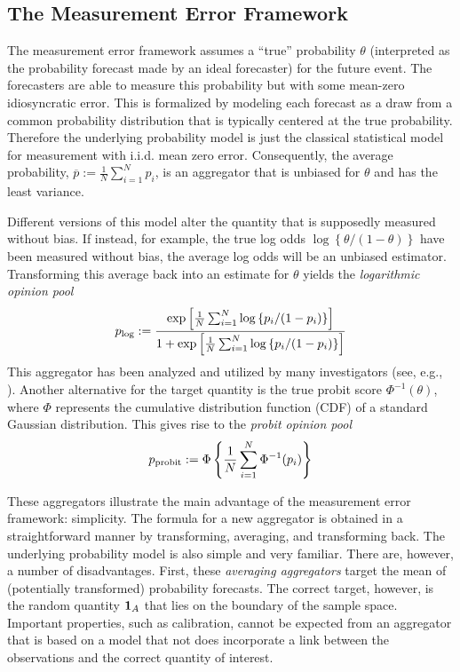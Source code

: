 \documentclass[11pt]{article}
\theoremstyle{definition}
\theoremstyle{definition}
\def\pb{\overline{p}}
\def\one{{\bf 1}}
\def\probit{p_{\rm probit}}
\def\plog{p_{\rm log}}
\begin{document}
\subsection{The Measurement Error Framework}
\label{ss:measurement}
The measurement error framework assumes a ``true'' probability
$\theta$ (interpreted as the probability forecast made by an ideal
forecaster) for the future event.  The forecasters are able to measure
this probability but with some mean-zero idiosyncratic error.  This is
formalized by modeling each forecast as a draw from a common
probability distribution that is typically centered at the true
probability. Therefore the underlying probability model is just the 
classical statistical model for measurement with i.i.d. mean zero error.
Consequently, the average probability, $\pb := \frac{1}{N}\sum_{i=1}^N
p_i$, is an aggregator that is unbiased for $\theta$ and has the least
variance.

Different versions of this model alter the quantity that is supposedly
measured without bias. If instead, for example, the true log odds
$\log\left\{\theta/(1-\theta)\right\}$ have been measured without
bias, the average log odds will be an unbiased estimator. Transforming
this average back into an estimate for $\theta$ yields the {\em
logarithmic opinion pool}
$$\plog := \frac{\exp \left [ \frac{1}{N} \sum_{i=1}^N
   \log \left\{ p_i / (1-p_i) \right\} \right ]} {1 + \exp \left [
\frac{1}{N} \sum_{i=1}^N \log \left\{p_i / (1-p_i)\right\} \right
]} $$ This aggregator has been analyzed and utilized by many
investigators (see, e.g., \citealt{dawid1995coherent, Genest,
bacharach1975group}). Another alternative for the target quantity is
the true probit score $\Phi^{-1}(\theta)$, where $\Phi$ represents the
cumulative distribution function (CDF) of a standard Gaussian
distribution. This gives rise to the {\em probit opinion pool}
$$\probit := \Phi \left\{ \frac{1}{N} \sum_{i=1}^N \Phi^{-1}
   (p_i) \right \} $$

These aggregators illustrate the main advantage of the measurement
error framework: simplicity.  The formula for a new aggregator is
obtained in a straightforward manner by transforming, averaging, and
transforming back.  The underlying probability model is also simple
and very familiar.  There are, however, a number of disadvantages.
First, these \textit{averaging aggregators} target the mean of
(potentially transformed) probability forecasts. The correct target,
however, is the random quantity $\one_A$ that lies on the boundary of
the sample space. Important properties, such as calibration, cannot be
expected from an aggregator that is based on a model that not does
incorporate a link between the observations and the correct quantity
of interest.
\end{document}
